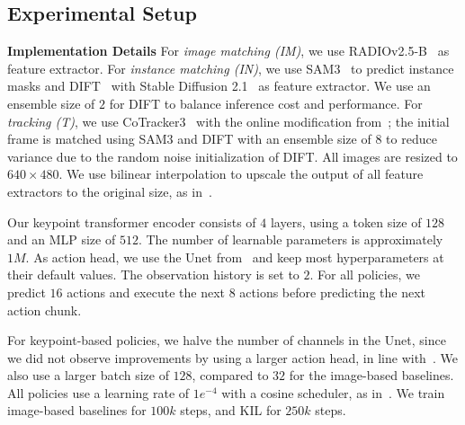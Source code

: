 \documentclass[letterpaper, 10 pt, conference]{ieeeconf}  %
\newif\ifappendixincluded
\newcommand{\appendixnote}[1]{\ifappendixincluded#1\fi}
\begin{document}
\subsection{Experimental Setup}
\label{sec:experiments-setup}
\textbf{Implementation Details}
For \textit{image matching (IM)}, we use RADIOv2.5-B~\cite{heinrich2025radiov2.5} as feature extractor. For \textit{instance matching (IN)}, we use SAM3~\cite{carion2025sam3} to predict instance masks and DIFT~\cite{tang2023dift} with Stable Diffusion 2.1~\cite{rombach2022stable-diffusion} as feature extractor.
We use an ensemble size of $2$ for DIFT to balance inference cost and performance. For \textit{tracking (T)}, we use CoTracker3~\cite{karaev2025cotracker3} with the online modification from~\cite{Levy2025P3PO}; the initial frame is matched using SAM3 and DIFT with an ensemble size of $8$ to reduce variance due to the random noise initialization of DIFT. All images are resized to $640\times480$. We use bilinear interpolation to upscale the output of all feature extractors to the original size, as in~\cite{wang2025skil,huang2025rekep}.

Our keypoint transformer encoder consists of $4$ layers, using a token size of $128$ and an MLP size of $512$. The number of learnable parameters is approximately $1M$. As action head, we use the Unet from~\cite{chi2025diffusion_policy} and keep most hyperparameters at their default values. The observation history is set to $2$.
For all policies, we predict $16$ actions and execute the next $8$ actions before predicting the next action chunk.

For keypoint-based policies, we halve the number of channels in the Unet, since we did not observe improvements by using a larger action head, in line with~\cite{lin2025imitation_scaling_laws}. We also use a larger batch size of  $128$, compared to $32$ for the image-based baselines. All policies use a learning rate of $1e^{-4}$ with a cosine scheduler, as in~\cite{chi2025diffusion_policy}.
We train image-based baselines for $100k$ steps, and KIL for $250k$ steps. %
\appendixnote{Additional details on the implementation, hyperparameters and inference latencies are reported in Appendix~\ref{sec:appendix-implementation-details-and-hyperparameters}.}
\end{document}
